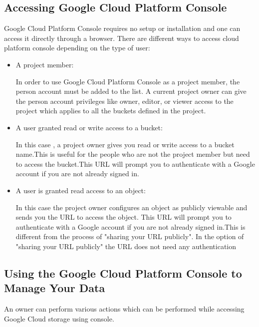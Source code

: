 \documentclass[9pt,twocolumn,twoside]{styles/osajnl}
\begin{document}
\subsection{Accessing Google Cloud Platform Console}


Google Cloud Platform Console requires no setup or installation and one can access it directly through a browser. There are different ways to access cloud platform console depending on the type of user:

\begin{itemize}
\item A project member: 

In order to use Google Cloud Platform Console as a project member, the person account must be added to the list. A current project owner can give the person account privileges like owner, editor, or viewer access to the project which applies to all the buckets defined in the project.

\item A user granted read or write access to a bucket:

In this case , a project owner  gives you read or write access to a bucket name.This is useful for the people who are not the project member but need to access the bucket.This URL will prompt you to authenticate with a Google account if you are not already signed in.
	

\item A user is granted read access to an object:

In this case the project owner configures an object as publicly viewable and sends you the URL to access the object. This URL will prompt you to authenticate with a Google account if you are not already signed in.This is different from the process of "sharing your URL publicly". In the option of "sharing your URL publicly" the URL does not need any authentication

\end{itemize}

\subsection{Using the Google Cloud Platform Console to Manage Your Data}

An owner can perform various actions which can be performed while accessing Google Cloud storage using console.
\end{document}

